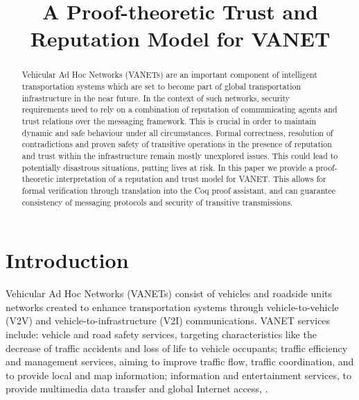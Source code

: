 \documentclass[compsoc, conference, letterpaper, 10pt, times]{IEEEtran}
\begin{document}
\title{A Proof-theoretic Trust and Reputation Model for VANET}


\author{
	}


\maketitle

\begin{abstract}
Vehicular Ad Hoc Networks (VANETs) are an important component of intelligent transportation systems which are set to become part of global transportation infrastructure in the near future. In the context of such networks, security requirements need to rely on a combination of reputation of communicating agents and trust relations over the messaging framework. This is crucial in order to maintain dynamic and safe behaviour under all circumstances. Formal correctness, resolution of contradictions and proven safety of transitive operations in the presence of reputation and trust within the infrastructure remain mostly unexplored issues. This could lead to potentially disastrous situations, putting lives at risk. In this paper we provide a proof-theoretic interpretation of a reputation and trust model for VANET. This allows for formal verification through translation into the Coq proof assistant, and can guarantee consistency of messaging protocols and security of transitive transmissions.
\end{abstract}


\section{Introduction}\label{sec:intro}

Vehicular Ad Hoc Networks (VANETs) consist of vehicles and roadside units networks created to enhance transportation systems through vehicle-to-vehicle (V2V) and vehicle-to-infrastructure (V2I) communications. VANET services include: vehicle and road safety services, targeting characteristics like the decrease of traffic accidents and loss of life to vehicle occupants; traffic efficiency and management services, aiming to improve traffic flow, traffic coordination, and to provide local and map information; information and entertainment services, to provide multimedia data transfer and global Internet access, \cite{6849111}. 
\end{document}
